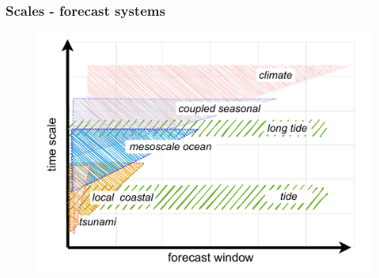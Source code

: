 \begin{frame}
\frametitle{Scales - forecast systems}
    \begin{figure}      
     \includegraphics[height=0.8\textheight]{figures/diagrams/scales.pdf}
    \end{figure} 
\end{frame}

